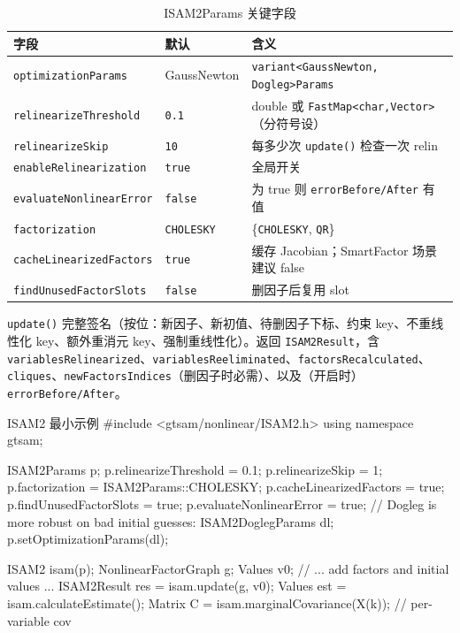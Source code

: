 \begin{table}[H]\centering\small
\caption{ISAM2Params 关键字段}
\label{tab:isam2params}
\begin{tabular}{lll}
\toprule
字段 & 默认 & 含义 \\
\midrule
\texttt{optimizationParams} & GaussNewton & \texttt{variant<GaussNewton, Dogleg>Params} \\
\texttt{relinearizeThreshold} & \texttt{0.1} & double 或 \texttt{FastMap<char,Vector>}（分符号设） \\
\texttt{relinearizeSkip} & \texttt{10} & 每多少次 \texttt{update()} 检查一次 relin \\
\texttt{enableRelinearization} & \texttt{true} & 全局开关 \\
\texttt{evaluateNonlinearError} & \texttt{false} & 为 true 则 \texttt{errorBefore/\allowbreak After} 有值 \\
\texttt{factorization} & \texttt{CHOLESKY} & \{\texttt{CHOLESKY}, \texttt{QR}\} \\
\texttt{cacheLinearizedFactors} & \texttt{true} & 缓存 Jacobian；SmartFactor 场景建议 false \\
\texttt{findUnusedFactorSlots} & \texttt{false} & 删因子后复用 slot \\
\bottomrule
\end{tabular}
\end{table}

\noindent \texttt{update()} 完整签名（按位：新因子、新初值、待删因子下标、约束 key、不重线性化 key、额外重消元 key、强制重线性化）。返回 \texttt{ISAM2Result}，含 \texttt{variablesRelinearized}、\texttt{variablesReeliminated}、\texttt{factorsRecalculated}、\texttt{cliques}、\texttt{newFactorsIndices}（删因子时必需）、以及（开启时）\texttt{errorBefore/\allowbreak After}。

\begin{codebox}[C++]{ISAM2 最小示例}
#include <gtsam/nonlinear/ISAM2.h>
using namespace gtsam;

ISAM2Params p;
p.relinearizeThreshold   = 0.1;
p.relinearizeSkip        = 1;
p.factorization          = ISAM2Params::CHOLESKY;
p.cacheLinearizedFactors = true;
p.findUnusedFactorSlots  = true;
p.evaluateNonlinearError = true;
// Dogleg is more robust on bad initial guesses:
ISAM2DoglegParams dl; p.setOptimizationParams(dl);

ISAM2 isam(p);
NonlinearFactorGraph g; Values v0;
// ... add factors and initial values ...
ISAM2Result res = isam.update(g, v0);
Values est = isam.calculateEstimate();
Matrix C   = isam.marginalCovariance(X(k));   // per-variable cov
\end{codebox}

